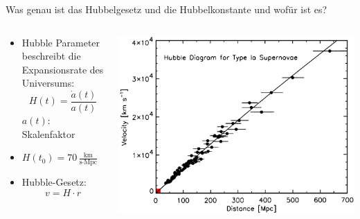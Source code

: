 \begin{frame}{Was genau ist das Hubbelgesetz und die Hubbelkonstante und wofür ist es?}
  \begin{columns}
    \begin{column}{0.5\textwidth}
      \begin{itemize}
          \setlength\itemsep{2em}
        \item Hubble Parameter beschreibt die Expansionsrate des Universums:
        \begin{equation*}
          H(t)=\frac{\dot a(t)}{a(t)}
      \end{equation*}
      $a(t)$: Skalenfaktor
      \item $H(t_0)=70\,\frac{\text{km}}{\text{s}\cdot \text{Mpc}}$
      \item Hubble-Gesetz:
      \begin{equation*}
        v=H\cdot r
      \end{equation*}
      \end{itemize}
    \end{column}
    \begin{column}{0.5\textwidth}
  \includegraphics[width=\textwidth]{images/hubble.jpg}
    \end{column}
  \end{columns}
\end{frame}

